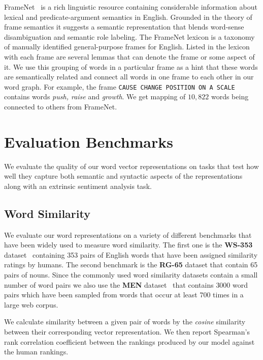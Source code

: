 \documentclass[11pt]{article}
\begin{document}
FrameNet~\cite{fillmore-ua-2003} is a rich linguistic resource containing considerable information about
lexical and predicate-argument semantics in English. Grounded in the theory of frame semantics it suggests 
a semantic representation that blends word-sense disambiguation and semantic role labeling. The FrameNet lexicon
\cite{Baker:1998:BFP:980845.980860} is a taxonomy of manually identified general-purpose frames for English. 
Listed in the lexicon with each frame are several lemmas that can denote the frame or some aspect of it. 
We use this grouping of words in a particular frame as a hint that these words are semantically related and
connect all words in one frame to each other in our word graph. For example, the frame \texttt{CAUSE CHANGE POSITION ON A SCALE} contains words \textit{push, raise} and \textit{growth}. We get mapping of $10,822$ words being connected to others from FrameNet. 

\section{Evaluation Benchmarks}
\label{sec:eval}

We evaluate the quality of our word vector representations on tasks that
test how well they capture both semantic and syntactic aspects of the representations
along with an extrinsic sentiment analysis task.

\subsection{Word Similarity}
\label{sec:word-sim}

We evaluate our word representations on a variety of different benchmarks that
have been widely used to measure word similarity. The first one is the \textbf{WS-353}
dataset~\cite{citeulike:379845} containing 353 pairs of English words that have been 
assigned similarity ratings by humans. The second benchmark is the \textbf{RG-65} 
\cite{Rubenstein:1965:CCS:365628.365657} dataset that contain 65 pairs of nouns. 
Since the commonly used word similarity datasets contain a small number of word pairs we
also use the \textbf{MEN} dataset~\cite{bruni:2012} that contains $3000$ word 
pairs which have been sampled from words
that occur at least $700$ times in a large web corpus. 

We calculate similarity between a given pair of words by the \textit{cosine}
similarity between their corresponding vector representation.
We then report Spearman's rank correlation coefficient 
\cite{citeulike:8703893} between the rankings produced by our model against the human rankings.
\end{document}
